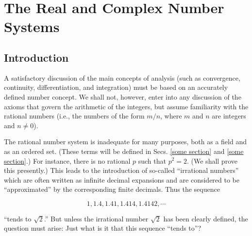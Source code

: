 %
%
% 


\chapter{The Real and Complex Number Systems}\label{ch:real_complex_numbers}

\section*{Introduction}
A satisfactory discussion of the main concepts of analysis (such as convergence, continuity, differentiation, and integration) 
must be based on an accurately defined number concept. We shall not, however, enter into any discussion of the axioms that govern 
the arithmetic of the integers, but assume familiarity with the rational numbers (i.e., the numbers of the form 
$m/n$, where $m$ and $n$ are integers and $n \neq 0$).

\indent The rational number system is inadequate for many purposes, both as a field and as an ordered set. (These terms will be 
defined in Secs. \ref{some section} and \ref{some section}.) For instance, there is no rational $p$ such that $p^2 = 2$. (We shall prove this presently.) 
This leads to the introduction of so-called ``irrational numbers'' which are often written as infinite decimal expansions and are 
considered to be ``approximated'' by the corresponding finite decimals. Thus the sequence 

\begin{equation*}
1, 1.4, 1.41, 1.414, 1.4142,\cdots
\end{equation*}

``tends to $\sqrt{2}$.'' But unless the irrational number $\sqrt{2}$ has been clearly defined, the question must arise: Just what 
is it that this sequence ``tends to''?

